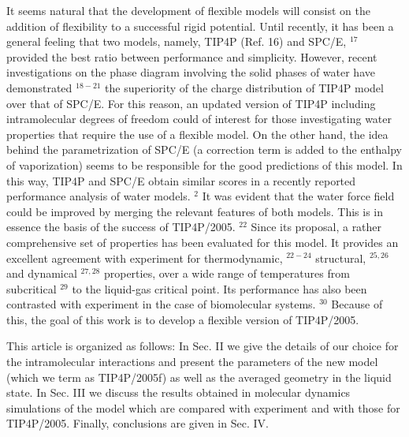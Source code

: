 \documentclass[10pt]{article}
\begin{document}
It seems natural that the development of flexible models will consist on the addition of flexibility to a successful rigid potential. Until recently, it has been a general feeling that two models, namely, TIP4P (Ref. 16) and SPC/E, ${ }^{17}$ provided the best ratio between performance and simplicity. However, recent investigations on the phase diagram involving the solid phases of water have demonstrated ${ }^{18-21}$ the superiority of the charge distribution of TIP4P model over that of SPC/E. For this reason, an updated version of TIP4P including intramolecular degrees of freedom could of interest for those investigating water properties that require the use of a flexible model. On the other hand, the idea behind the parametrization of SPC/E (a correction term is added to the enthalpy of vaporization) seems to be responsible for the good predictions of this model. In this way, TIP4P and SPC/E obtain similar scores in a recently reported performance analysis of water models. ${ }^{2}$ It was evident that the water force field could be improved by merging the relevant features of both models. This is in essence the basis of the success of TIP4P/2005. ${ }^{22}$ Since its proposal, a rather comprehensive set of properties has been evaluated for this model. It provides an excellent agreement with experiment for thermodynamic, ${ }^{22-24}$ structural, ${ }^{25,26}$ and dynamical ${ }^{27,28}$ properties, over a wide range of temperatures from subcritical ${ }^{29}$ to the liquid-gas critical point. Its performance has also been contrasted with experiment in the case of biomolecular systems. ${ }^{30}$ Because of this, the goal of this work is to develop a flexible version of TIP4P/2005.

This article is organized as follows: In Sec. II we give the details of our choice for the intramolecular interactions and present the parameters of the new model (which we term as TIP4P/2005f) as well as the averaged geometry in the liquid state. In Sec. III we discuss the results obtained in molecular dynamics simulations of the model which are compared with experiment and with those for TIP4P/2005. Finally, conclusions are given in Sec. IV.
\end{document}
